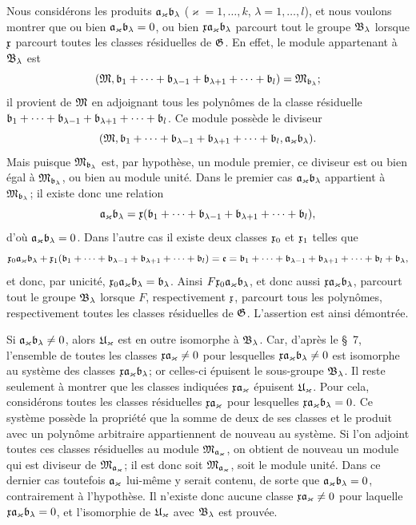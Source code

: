 Nous considérons les produits $\mathfrak{a}_\varkappa\mathfrak{b}_\lambda$ ($\varkappa=1,\ldots,k$, $\lambda=1,\ldots,l$), et nous voulons montrer que ou bien $\mathfrak{a}_\varkappa\mathfrak{b}_\lambda=0$, ou bien $\mathfrak{x}\mathfrak{a}_\varkappa\mathfrak{b}_\lambda$ parcourt tout le groupe $\mathfrak{B}_\lambda$ lorsque $\mathfrak{x}$ parcourt toutes les classes résiduelles de $\mathfrak{G}$. En effet, le module appartenant à $\mathfrak{B}_\lambda$ est
\[
 (\mathfrak{M},\mathfrak{b}_1+\cdots+\mathfrak{b}_{\lambda-1}+\mathfrak{b}_{\lambda+1}+\cdots+\mathfrak{b}_l)=\mathfrak{M}_{\mathfrak{b}_\lambda};
\]
il provient de $\mathfrak{M}$ en adjoignant tous les polynômes de la classe résiduelle $\mathfrak{b}_1+\cdots+\mathfrak{b}_{\lambda-1}+\mathfrak{b}_{\lambda+1}+\cdots+\mathfrak{b}_l$. Ce module possède le diviseur
\[
 (\mathfrak{M},\mathfrak{b}_1+\cdots+\mathfrak{b}_{\lambda-1}+\mathfrak{b}_{\lambda+1}+\cdots+\mathfrak{b}_l,
 \mathfrak{a}_\varkappa\mathfrak{b}_\lambda).
\]
Mais puisque $\mathfrak{M}_{\mathfrak{b}_\lambda}$ est, par hypothèse, un module premier, ce diviseur est ou bien égal à $\mathfrak{M}_{\mathfrak{b}_\lambda}$, ou bien au module unité. Dans le premier cas $\mathfrak{a}_\varkappa\mathfrak{b}_\lambda$ appartient à $\mathfrak{M}_{\mathfrak{b}_\lambda}$; il existe donc une relation
\[
 \mathfrak{a}_\varkappa\mathfrak{b}_\lambda=\mathfrak{x}(\mathfrak{b}_1+\cdots+\mathfrak{b}_{\lambda-1}+\mathfrak{b}_{\lambda+1}+\cdots+\mathfrak{b}_l),
\]
d'où $\mathfrak{a}_\varkappa\mathfrak{b}_\lambda=0$. Dans l'autre cas il existe deux classes $\mathfrak{x}_0$ et $\mathfrak{x}_1$ telles que
\[
 \mathfrak{x}_0\mathfrak{a}_\varkappa\mathfrak{b}_\lambda
 +\mathfrak{x}_1(\mathfrak{b}_1+\cdots+\mathfrak{b}_{\lambda-1}+\mathfrak{b}_{\lambda+1}+\cdots+\mathfrak{b}_l)
 =\mathfrak{e}=\mathfrak{b}_1+\cdots+\mathfrak{b}_{\lambda-1}+\mathfrak{b}_{\lambda+1}+\cdots+\mathfrak{b}_l+\mathfrak{b}_\lambda,
\]
et donc, par unicité, $\mathfrak{x}_0\mathfrak{a}_\varkappa\mathfrak{b}_\lambda=\mathfrak{b}_\lambda$. Ainsi $F\mathfrak{x}_0\mathfrak{a}_\varkappa\mathfrak{b}_\lambda$, et donc aussi $\mathfrak{x}\mathfrak{a}_\varkappa\mathfrak{b}_\lambda$, parcourt tout le groupe $\mathfrak{B}_\lambda$ lorsque $F$, respectivement $\mathfrak{x}$, parcourt tous les polynômes, respectivement toutes les classes résiduelles de $\mathfrak{G}$. L'assertion est ainsi démontrée.

Si $\mathfrak{a}_\varkappa\mathfrak{b}_\lambda\ne0$, alors $\mathfrak{U}_\varkappa$ est en outre isomorphe à $\mathfrak{B}_\lambda$. Car, d'après le \S~7, l'ensemble de toutes les classes $\mathfrak{x}\mathfrak{a}_\varkappa\ne0$ pour lesquelles $\mathfrak{x}\mathfrak{a}_\varkappa\mathfrak{b}_\lambda\ne0$ est isomorphe au système des classes $\mathfrak{x}\mathfrak{a}_\varkappa\mathfrak{b}_\lambda$; or celles-ci épuisent le sous-groupe $\mathfrak{B}_\lambda$. Il reste seulement à montrer que les classes indiquées $\mathfrak{x}\mathfrak{a}_\varkappa$ épuisent $\mathfrak{U}_\varkappa$. Pour cela, considérons toutes les classes résiduelles $\mathfrak{x}\mathfrak{a}_\varkappa$ pour lesquelles $\mathfrak{x}\mathfrak{a}_\varkappa\mathfrak{b}_\lambda=0$. Ce système possède la propriété que la somme de deux de ses classes et le produit avec un polynôme arbitraire appartiennent de nouveau au système. Si l'on adjoint toutes ces classes résiduelles au module $\mathfrak{M}_{\mathfrak{a}_\varkappa}$, on obtient de nouveau un module qui est diviseur de $\mathfrak{M}_{\mathfrak{a}_\varkappa}$; il est donc soit $\mathfrak{M}_{\mathfrak{a}_\varkappa}$, soit le module unité. Dans ce dernier cas toutefois $\mathfrak{a}_\varkappa$ lui-même y serait contenu, de sorte que $\mathfrak{a}_\varkappa\mathfrak{b}_\lambda=0$, contrairement à l'hypothèse. Il n'existe donc aucune classe $\mathfrak{x}\mathfrak{a}_\varkappa\ne0$ pour laquelle $\mathfrak{x}\mathfrak{a}_\varkappa\mathfrak{b}_\lambda=0$, et l'isomorphie de $\mathfrak{U}_\varkappa$ avec $\mathfrak{B}_\lambda$ est prouvée.

